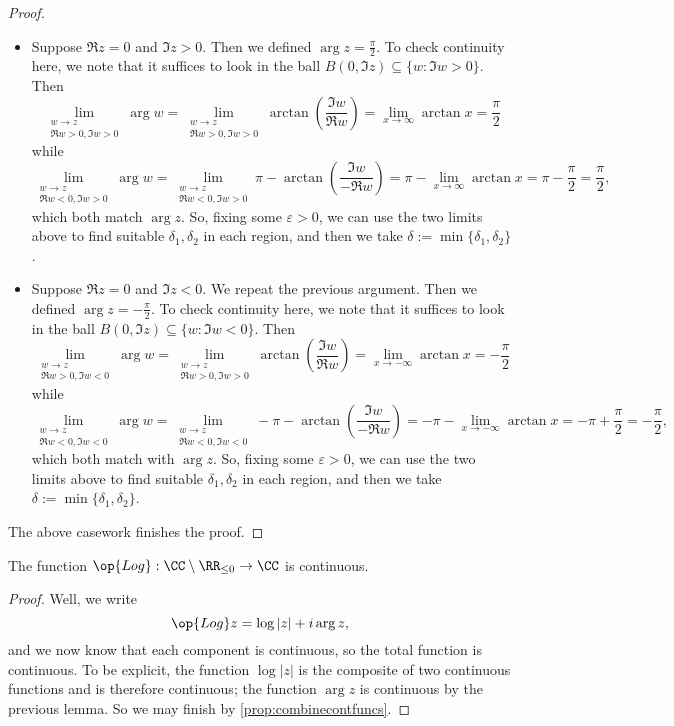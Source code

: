 \begin{proof}
\begin{itemize}
		\item Suppose $\Re z=0$ and $\Im z>0$. Then we defined $\arg z=\frac\pi2$. To check continuity here, we note that it suffices to look in the ball $B(0,\Im z)\subseteq\{w:\Im w>0\}$. Then
		\[\lim_{\substack{w\to z\\\Re w>0,\Im w>0}}\arg w=\lim_{\substack{w\to z\\\Re w>0,\Im w>0}}\arctan\left(\frac{\Im w}{\Re w}\right)=\lim_{x\to\infty}\arctan x=\frac\pi2\]
		while
		\[\lim_{\substack{w\to z\\\Re w<0,\Im w>0}}\arg w=\lim_{\substack{w\to z\\\Re w<0,\Im w>0}}\pi-\arctan\left(\frac{\Im w}{-\Re w}\right)=\pi-\lim_{x\to\infty}\arctan x=\pi-\frac\pi2=\frac\pi2,\]
		which both match $\arg z$. So, fixing some $\varepsilon>0$, we can use the two limits above to find suitable $\delta_1,\delta_2$ in each region, and then we take $\delta:=\min\{\delta_1,\delta_2\}$.
		\item Suppose $\Re z=0$ and $\Im z<0$. We repeat the previous argument. Then we defined $\arg z=-\frac\pi2$. To check continuity here, we note that it suffices to look in the ball $B(0,\Im z)\subseteq\{w:\Im w<0\}$. Then
		\[\lim_{\substack{w\to z\\\Re w>0,\Im w<0}}\arg w=\lim_{\substack{w\to z\\\Re w>0,\Im w>0}}\arctan\left(\frac{\Im w}{\Re w}\right)=\lim_{x\to-\infty}\arctan x=-\frac\pi2\]
		while
		\[\lim_{\substack{w\to z\\\Re w<0,\Im w<0}}\arg w=\lim_{\substack{w\to z\\\Re w<0,\Im w<0}}-\pi-\arctan\left(\frac{\Im w}{-\Re w}\right)=-\pi-\lim_{x\to-\infty}\arctan x=-\pi+\frac\pi2=-\frac\pi2,\]
		which both match with $\arg z$. So, fixing some $\varepsilon>0$, we can use the two limits above to find suitable $\delta_1,\delta_2$ in each region, and then we take $\delta:=\min\{\delta_1,\delta_2\}$.
	\end{itemize}
	The above casework finishes the proof.
\end{proof}
\begin{corollary} \label{cor:logcont}
	The function $\op{Log}:\CC\setminus\RR_{\le0}\to\CC$ is continuous.
\end{corollary}
\begin{proof}
	Well, we write
	\[\op{Log}z=\log|z|+i\arg z,\]
	and we now know that each component is continuous, so the total function is continuous. To be explicit, the function $\log|z|$ is the composite of two continuous functions and is therefore continuous; the function $\arg z$ is continuous by the previous lemma. So we may finish by \autoref{prop:combinecontfuncs}.
\end{proof}
